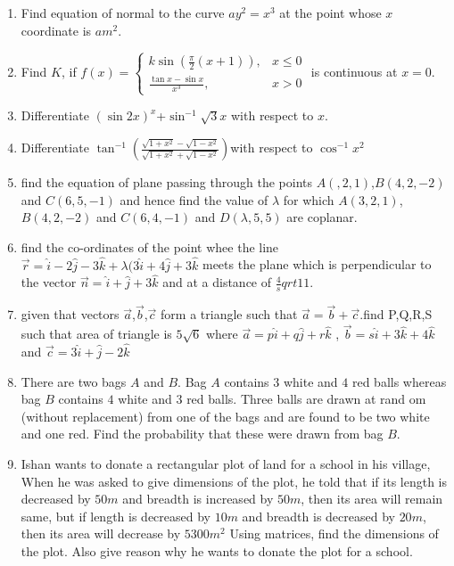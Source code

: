 \documentclass[12pt,-letter paper]{article}
\begin{document}
\begin{enumerate}
\item Find equation of normal to the curve $ay^2=x^3$ at the point whose $x$ coordinate is $am^2$. 
\item Find $K$, if $f(x) = \begin{cases}
 k \sin\left(\frac{\pi}{2}(x+1)\right), & x \leq 0 \\
\frac{\tan {x} - \sin{x}}{x^3}, & x > 0 \end{cases}$ is continuous at $x = 0$.
\item Differentiate $(\sin2x)^x$+$\sin^{-1}\sqrt3x$ with respect to $x$.
\item Differentiate $\tan^{-1}{(\frac{\sqrt{1+x^2}-\sqrt{1-x^2}}{\sqrt{1+x^2}+\sqrt{1-x^2}}) }$with respect to $\cos^{-1    }{x^2}$
\item find the equation of plane passing through the points $A(,2,1)$,$B(4,2,-2)$ and $C(6,5,-1)$ and hence find the value of $\lambda $ for which $ A(3,2,1)$,$B(4,2,-2)$ and $C(6,4,-1)$ and $D(\lambda,5,5)$ are coplanar.
\item find the co-ordinates of the point whee the line $\overrightarrow{r}=\hat{i}-2\hat{j}-3\hat{k}+\lambda(3\hat{i}+4\hat{j}+3\hat{k}$ meets the plane which is perpendicular to the vector $\overrightarrow{n}=\hat{i}+\hat{j}+3\hat{k}$ and at a distance of $\frac{4}sqrt{11}$.
\item given that vectors $\overrightarrow{a}$,$\overrightarrow{b}$,$\overrightarrow{c}$ form a triangle such that $\overrightarrow{a}=\overrightarrow{b}+\overrightarrow{c}$.find P,Q,R,S such that area  of triangle is $5\sqrt{6}$ where $\overrightarrow{a}=p\hat{i}+q\hat{j}+r\hat{k}$ , $\overrightarrow{b}=s\hat{i}+3\hat{k}+4\hat{k}$ and $\overrightarrow{c}=3\hat{i}+\hat{j}-2\hat{k}$ 
\item There are two bags $A$ and $B$. Bag $A$ contains $3$ white and $4$ red balls whereas bag $B$ contains $4$ white and $3$ red balls. Three balls are drawn at rand    om (without replacement) from one of the bags and are found to be two white and     one red. Find the probability that these were drawn from bag $B$.
\item Ishan wants to donate a rectangular plot of land for a school in his village, When he was asked to give dimensions of the plot, he told that  if its length is decreased by $50 m$ and breadth is increased by $50 m$,     then its area will remain same, but if length is decreased by $10 m$ and     breadth is decreased by   $20 m$, then its area will decrease by $5300 m     ^ 2 $  Using matrices, find the dimensions of the plot. Also give reason  why he wants to donate the plot for a school.

\end{enumerate}
\end{document}
